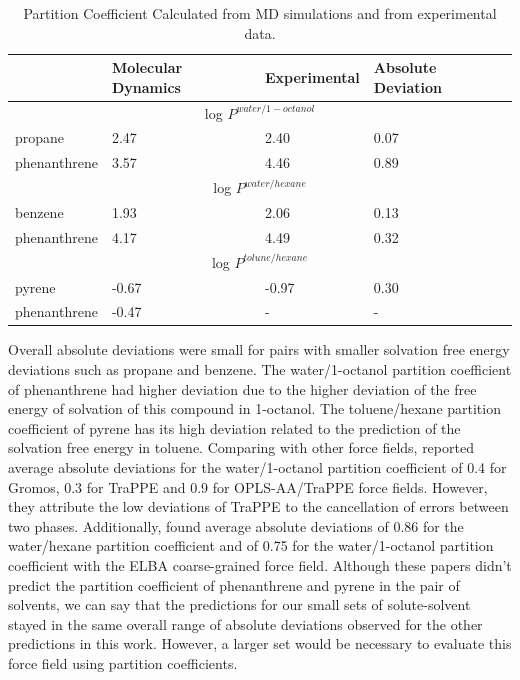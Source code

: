\begin{table}[H]
    \centering
    \caption{Partition Coefficient Calculated from MD simulations and from experimental data.}
    \label{tbl:part}
    \begin{tabular}{llll}
        \hline
         & {Molecular Dynamics} & {Experimental}& Absolute Deviation\\
       \hline
       \multicolumn{4}{c}{log $P^{water/1-octanol}$} \\
           \hline
       propane &2.47  &  2.40 & 0.07\\
       phenanthrene &3.57  & 4.46 & 0.89\\
       \hline
       \multicolumn{4}{c}{log $P^{water/hexane}$} \\
           \hline
       benzene &1.93  &  2.06 & 0.13\\
       phenanthrene &4.17  & 4.49 & 0.32 \\
       \hline
       \multicolumn{4}{c}{log $P^{tolune/hexane}$} \\
           \hline 
       pyrene &-0.67  &  -0.97 & 0.30\\
       phenanthrene &-0.47  & - & - \\ 
           \hline     
    \end{tabular}
    
\end{table}

Overall absolute deviations were small for pairs with smaller solvation free energy deviations such as propane and benzene. The water/1-octanol partition coefficient of phenanthrene had higher deviation due to the higher deviation of the free energy of solvation of this compound in 1-octanol. The toluene/hexane partition coefficient of pyrene has its high deviation related to the prediction of the solvation free energy in toluene. Comparing with other force fields,  reported average absolute deviations for the water/1-octanol partition coefficient of 0.4 for Gromos, 0.3 for TraPPE and 0.9 for OPLS-AA/TraPPE force fields. However, they attribute the low deviations of TraPPE to the cancellation of errors between two phases. Additionally,  found average absolute deviations of 0.86 for the water/hexane partition coefficient and of 0.75 for the water/1-octanol partition coefficient with the ELBA coarse-grained force field. Although these papers didn't predict the partition coefficient of phenanthrene and pyrene in the pair of solvents, we can say that the predictions for our small sets of solute-solvent stayed in the same overall range of absolute deviations observed for the other predictions in this work. However, a larger set would be necessary to evaluate this force field using partition coefficients. 